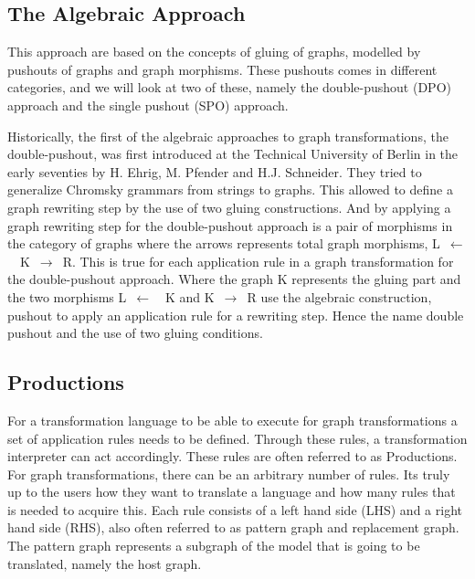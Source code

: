\documentclass[pdftex,11pt,a4paper]{article}
\begin{document}
\subsection{The Algebraic Approach}
\noindent This approach are based on the concepts of gluing of graphs, modelled
by pushouts of graphs and graph morphisms. These pushouts comes in different
categories, and we will look at two of these, namely the double-pushout (DPO)
approach and the single pushout (SPO) approach\cite{Loewe1997,Ehrig1997}.

\indent Historically, the first of the algebraic approaches to graph
transformations, the double-pushout, was first introduced at the Technical
University of Berlin in the early seventies by H. Ehrig, M. Pfender and H.J.
Schneider\cite{INSPEC:606170}. They tried to generalize Chromsky grammars from
strings to graphs. This allowed to define a graph rewriting step by the use of
two gluing constructions. And by applying a graph rewriting step for the
double-pushout approach is a pair of morphisms in the category of graphs where
the arrows represents total graph morphisms, \linebreak\mbox{L $\longleftarrow$
\ K $\longrightarrow$ R}. This is true for each application rule in a graph
transformation for the double-pushout approach. Where the graph K represents the
gluing part and the two morphisms \mbox{L $\longleftarrow$ \ K} and \mbox{K
$\longrightarrow$ R} use the algebraic construction, pushout to apply an
application rule for a rewriting step. Hence the name double pushout and the use
of two gluing conditions.

\subsection{Productions}
\noindent For a transformation language to be able to execute for graph
transformations a set of application rules needs to be defined. Through these
rules, a transformation interpreter can act accordingly. These rules are often
referred to as Productions. For graph transformations, there can be an arbitrary
number of rules. Its truly up to the users how they want to translate a
language and how many rules that is needed to acquire this. Each rule consists
of a left hand side (LHS) and a right hand side (RHS), also often referred to as
pattern graph and replacement graph. The pattern graph represents a subgraph of
the model that is going to be translated, namely the host graph.
\end{document}
